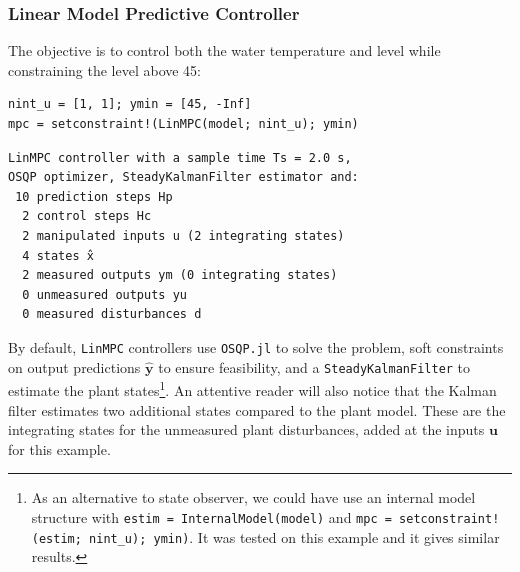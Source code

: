 \subsubsection{Linear Model Predictive Controller}

The objective is to control both the water temperature and level while constraining the level above 45:

\begin{verbatim}
nint_u = [1, 1]; ymin = [45, -Inf]
mpc = setconstraint!(LinMPC(model; nint_u); ymin)
\end{verbatim}
\spacerepl
\begin{verbatim}
LinMPC controller with a sample time Ts = 2.0 s,
OSQP optimizer, SteadyKalmanFilter estimator and:
 10 prediction steps Hp
  2 control steps Hc
  2 manipulated inputs u (2 integrating states)
  4 states x̂
  2 measured outputs ym (0 integrating states)
  0 unmeasured outputs yu
  0 measured disturbances d
\end{verbatim}

By default, \texttt{LinMPC} controllers use \texttt{OSQP.jl} to solve the problem, soft constraints on output predictions $\mathbf{\hat y}$ to ensure feasibility, and a \texttt{SteadyKalmanFilter} to estimate the plant states\footnote{As an alternative to state observer, we could have use an internal model structure with \texttt{estim = InternalModel(model)} and \texttt{mpc = setconstraint!(estim; nint\_u); ymin)}. It was tested on this example and it gives similar results.}. An attentive reader will also notice that the Kalman filter estimates two additional states compared to the plant model. These are the integrating states for the unmeasured plant disturbances, added at the inputs $\mathbf{u}$ for this example.

